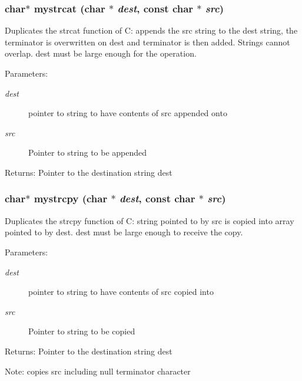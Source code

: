\subsubsection{\setlength{\rightskip}{0pt plus 5cm}char$\ast$ mystrcat (char $\ast$ {\em dest}, const char $\ast$ {\em src})}\label{mystring_8c_ebc286ca79fc1f0b7ca5d05066cd79a7}


Duplicates the strcat function of C: appends the src string to the dest string, the terminator is overwritten on dest and terminator is then added. Strings cannot overlap. dest must be large enough for the operation. \begin{Desc}
\item[Parameters:]
\begin{description}
\item[{\em dest}]pointer to string to have contents of src appended onto \item[{\em src}]Pointer to string to be appended \end{description}
\end{Desc}
\begin{Desc}
\item[Returns:]Pointer to the destination string dest \end{Desc}
\subsubsection{\setlength{\rightskip}{0pt plus 5cm}char$\ast$ mystrcpy (char $\ast$ {\em dest}, const char $\ast$ {\em src})}\label{mystring_8c_515b2c58f31e99a4564e463ffbf73e2f}


Duplicates the strcpy function of C: string pointed to by src is copied into array pointed to by dest. dest must be large enough to receive the copy. \begin{Desc}
\item[Parameters:]
\begin{description}
\item[{\em dest}]pointer to string to have contents of src copied into \item[{\em src}]Pointer to string to be copied \end{description}
\end{Desc}
\begin{Desc}
\item[Returns:]Pointer to the destination string dest \end{Desc}
\begin{Desc}
\item[Note:]copies src including null terminator character \end{Desc}
